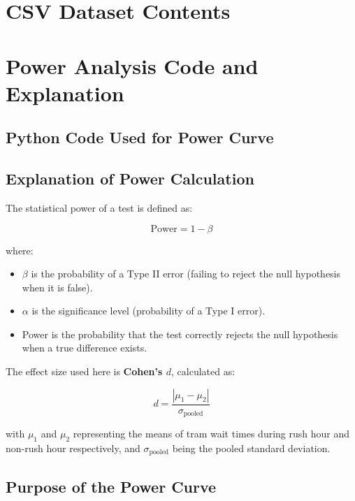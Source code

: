 \documentclass[a4paper, 10pt]{article}
\begin{document}
	\begin{appendices}
		\section{CSV Dataset Contents}
		\label{sec:rawdata}
		

		\newpage
		\section{Power Analysis Code and Explanation}
		\label{sec:power_analysis}

		\subsection*{Python Code Used for Power Curve}
				

			\subsection*{Explanation of Power Calculation}

				The statistical power of a test is defined as:

				\[
				\text{Power} = 1 - \beta
				\]

				where:
				\begin{itemize}
						\item \( \beta \) is the probability of a Type II error (failing to reject the null hypothesis when it is false).
						\item \( \alpha \) is the significance level (probability of a Type I error).
						\item Power is the probability that the test correctly rejects the null hypothesis when a true difference exists.
				\end{itemize}

				The effect size used here is \textbf{Cohen's \( d \)}, calculated as:

				\[
				d = \frac{|\mu_1 - \mu_2|}{\sigma_{\text{pooled}}}
				\]

				with \( \mu_1 \) and \( \mu_2 \) representing the means of tram wait times during rush hour and non-rush hour respectively, and \( \sigma_{\text{pooled}} \) being the pooled standard deviation.

			\subsection*{Purpose of the Power Curve}


\end{appendices}
\end{document}
